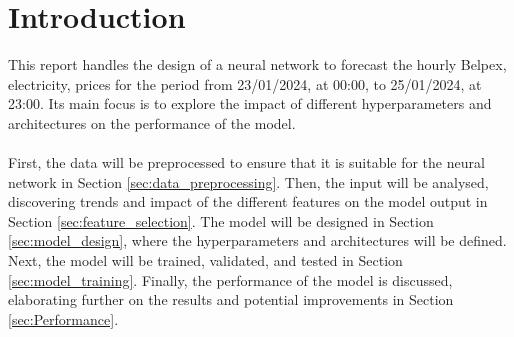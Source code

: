 \section{Introduction}
\label{sec:introduction}
This report handles the design of a neural network to forecast the hourly Belpex, electricity, prices for the period from 23/01/2024, at 00:00, to 25/01/2024, at 23:00. Its main focus is to explore the impact of different hyperparameters and architectures on the performance of the model.
\\ \\
First, the data will be preprocessed to ensure that it is suitable for the neural network in Section \ref{sec:data_preprocessing}. Then, the input will be analysed, discovering trends and impact of the different features on the model output in Section \ref{sec:feature_selection}. The model will be designed in Section \ref{sec:model_design}, where the hyperparameters and architectures will be defined. Next, the model will be trained, validated, and tested in Section \ref{sec:model_training}. Finally, the performance of the model is discussed, elaborating further on the results and potential improvements in Section \ref{sec:Performance}.


